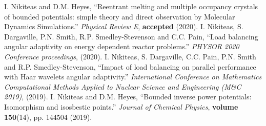\begingroup
\renewcommand{\section}[2]{}%
\begin{thebibliography}{}%
    I. Nikiteas and D.M. Heyes,
    ``Reentrant melting and multiple occupancy crystals of bounded
    potentials: simple theory and direct observation by Molecular
    Dynamics Simulations.'' \textit{Physical Review E}, \textbf{accepted} (2020).
    \newline \newline
    I. Nikiteas, S. Dargaville, P.N. Smith,  R.P. Smedley-Stevenson and C.C. Pain,
    ``Load balancing angular adaptivity on energy dependent reactor problems.''
    \textit{PHYSOR 2020 Conference proceedings}, (2020).
    \newline \newline
    I. Nikiteas, S. Dargaville, C.C. Pain, P.N. Smith and R.P. Smedley-Stevenson,
    ``Impact of load balancing on parallel performance with Haar wavelets angular adaptivity.''
    \textit{International Conference on Mathematics Computational Methods Applied
    to Nuclear Science and Engineering (M\&C 2019)}, (2019).
    \newline \newline
    I. Nikiteas and D.M. Heyes,
    ``Bounded inverse power potentials: Isomorphism and isosbestic points.''\newline
    \textit{Journal of Chemical Physics}, \textbf{volume 150}(14), pp. 144504 (2019).
\end{thebibliography}
%
%

